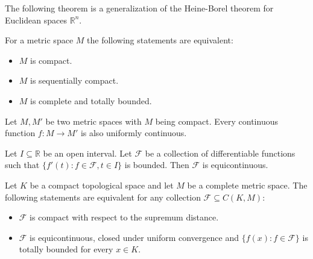 	The following theorem is a generalization of the Heine-Borel theorem for Euclidean spaces $\mathbb{R}^n$.
	\begin{theorem}
		For a metric space $M$ the following statements are equivalent:
		\begin{itemize}
			\item $M$ is compact.
			\item $M$ is sequentially compact.
			\item $M$ is complete and totally bounded.
		\end{itemize}
	\end{theorem}	
	
	\begin{theorem}
		Let $M, M'$ be two metric spaces with $M$ being compact. Every continuous function $f:M\rightarrow M'$ is also uniformly continuous.
	\end{theorem}
	

	
	\begin{property}
		Let $I\subseteq\mathbb{R}$ be an open interval. Let $\mathcal{F}$ be a collection of differentiable functions such that $\{f'(t):f\in\mathcal{F}, t\in I\}$ is bounded. Then $\mathcal{F}$ is equicontinuous.
	\end{property}
	
	\begin{theorem}
		Let $K$ be a compact topological space and let $M$ be a complete metric space. The following statements are equivalent for any collection $\mathcal{F}\subseteq C(K, M)$:
		\begin{itemize}
			\item $\mathcal{F}$ is compact with respect to the supremum distance\footnotemark.
			\item $\mathcal{F}$ is equicontinuous, closed under uniform convergence and $\{f(x):f\in\mathcal{F}\}$ is totally bounded for every $x\in K$.
		\end{itemize}
	\end{theorem}
